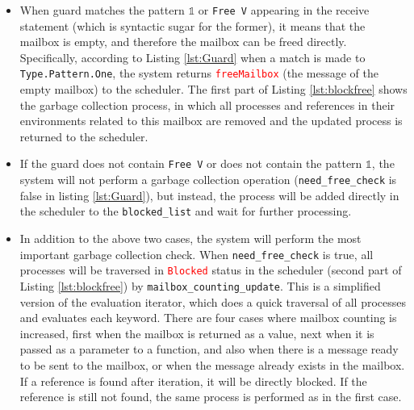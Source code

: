 \documentclass{l4proj}
\begin{document}
\begin{itemize}
\item When guard matches the pattern $\mathbb{1}$ or \texttt{Free V} appearing in the receive statement (which is syntactic sugar for the former), it means that the mailbox is empty, and therefore the mailbox can be freed directly. Specifically, according to Listing \ref{lst:Guard} when a match is made to \texttt{Type.Pattern.One}, the system returns \textcolor{red}{\texttt{freeMailbox}} (the message of the empty mailbox) to the scheduler. The first part of Listing \ref{lst:blockfree} shows the garbage collection process, in which all processes and references in their environments related to this mailbox are removed and the updated process is returned to the scheduler.

\item If the guard does not contain \texttt{Free V} or does not contain the pattern $\mathbb{1}$, the system will not perform a garbage collection operation (\texttt{need\_free\_check} is false in listing \ref{lst:Guard}), but instead, the process will be added directly in the scheduler to the \texttt{blocked\_list} and wait for further processing.

\item In addition to the above two cases, the system will perform the most important garbage collection check. When \texttt{need\_free\_check} is true, all processes will be traversed in \textcolor{red}{\texttt{Blocked}} status in the scheduler (second part of Listing \ref{lst:blockfree}) by \texttt{mailbox\_counting\_update}. This is a simplified version of the evaluation iterator, which does a quick traversal of all processes and evaluates each keyword. There are four cases where mailbox counting is increased, first when the mailbox is returned as a value, next when it is passed as a parameter to a function, and also when there is a message ready to be sent to the mailbox, or when the message already exists in the mailbox. If a reference is found after iteration, it will be directly blocked. If the reference is still not found, the same process is performed as in the first case.
\end{itemize}
\end{document}
